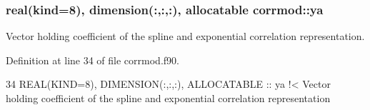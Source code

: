 \subsubsection[{\texorpdfstring{ya}{ya}}]{\setlength{\rightskip}{0pt plus 5cm}real(kind=8), dimension(\+:,\+:,\+:), allocatable corrmod\+::ya\hspace{0.3cm}{\ttfamily [private]}}\hypertarget{namespacecorrmod_aae7d37a1064807c18f234f1c74d46afc}{}\label{namespacecorrmod_aae7d37a1064807c18f234f1c74d46afc}


Vector holding coefficient of the spline and exponential correlation representation. 



Definition at line 34 of file corrmod.\+f90.


\begin{DoxyCode}
34   \textcolor{keywordtype}{REAL(KIND=8)}, \textcolor{keywordtype}{DIMENSION(:,:,:)}, \textcolor{keywordtype}{ALLOCATABLE} :: ya\textcolor{comment}{ !< Vector holding coefficient of the spline and
       exponential correlation representation}
\end{DoxyCode}
